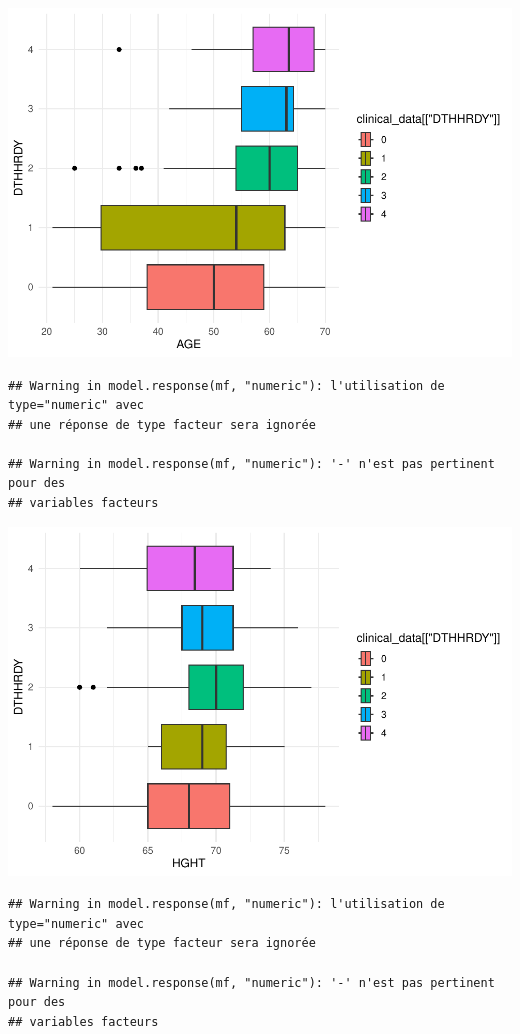 \documentclass[
]{article}
\begin{document}
\includegraphics{Q1_markdown_files/figure-latex/unnamed-chunk-8-8.pdf}

\begin{verbatim}
## Warning in model.response(mf, "numeric"): l'utilisation de type="numeric" avec
## une réponse de type facteur sera ignorée

## Warning in model.response(mf, "numeric"): '-' n'est pas pertinent pour des
## variables facteurs
\end{verbatim}

\includegraphics{Q1_markdown_files/figure-latex/unnamed-chunk-8-9.pdf}

\begin{verbatim}
## Warning in model.response(mf, "numeric"): l'utilisation de type="numeric" avec
## une réponse de type facteur sera ignorée

## Warning in model.response(mf, "numeric"): '-' n'est pas pertinent pour des
## variables facteurs
\end{verbatim}
\end{document}
